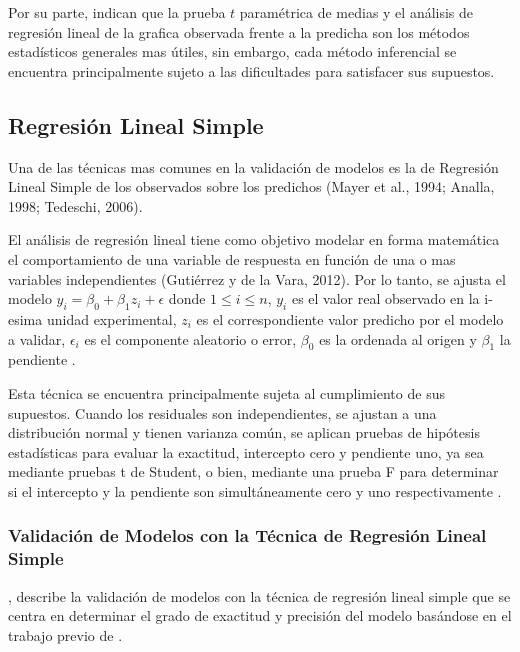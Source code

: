 Por su parte, \textcite{mayer-butler-1993} indican que la prueba $t$ paramétrica de medias y el análisis de regresión lineal de la grafica observada frente a la predicha son los métodos estadísticos generales mas útiles, sin embargo, cada método inferencial se encuentra principalmente sujeto a las dificultades para satisfacer sus supuestos.
\vspace{.5cm}



\subsection{Regresión Lineal Simple}
Una de las técnicas mas comunes en la validación de modelos es la de Regresión Lineal Simple de los observados sobre los predichos (Mayer et al., 1994; Analla, 1998; Tedeschi, 2006).
\vspace{.5cm}


El análisis de regresión lineal tiene como objetivo modelar en forma matemática el comportamiento de una variable de respuesta en función de una o mas variables independientes
(Gutiérrez y de la Vara, 2012). Por lo tanto, se ajusta el modelo  $ y_{i} = \beta_{0} + \beta_{1}z_{i} +\epsilon $ donde $ 1 \leq i \leq n$, $ y_{i}$ es el valor real observado en la i-esima unidad experimental, $ z_{i}$ es el correspondiente valor predicho por el modelo a validar, $\epsilon_{i}$ es el componente aleatorio o error, $\beta_{0}$ es la ordenada al origen y $\beta_{1}$ la pendiente \parencite{zacarias-2023}.
\vspace{.5cm}


Esta técnica se encuentra principalmente sujeta al cumplimiento de sus supuestos. Cuando los residuales son independientes, se ajustan a una distribución normal y tienen varianza común, se aplican pruebas de hipótesis estadísticas para evaluar la exactitud, intercepto cero y pendiente uno, ya sea mediante pruebas t de Student, o bien, mediante una prueba F para determinar si el intercepto y la pendiente son simultáneamente cero y uno respectivamente \parencite{balam-2012}.




\subsubsection{Validación de Modelos con la Técnica de Regresión Lineal Simple \parencite{febles-2014}}

\textcite{febles-2014}, describe la validación de modelos con la técnica de regresión lineal simple que se centra en determinar el grado de exactitud y precisión del modelo basándose en el trabajo previo de \textcite{balam-2012}.\\

